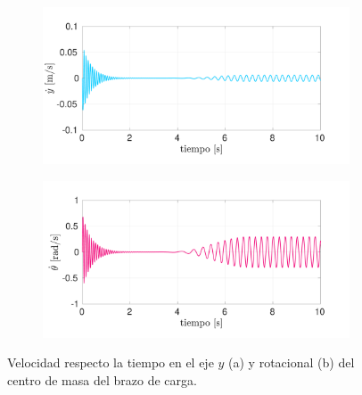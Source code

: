 \begin{figure}[p]
\centering
	\begin{subfigure}{1\linewidth}
		\centering
		\includegraphics[width=1\linewidth]{Imagenes/yp_2.pdf}
		\caption{}\label{fig:yp_2}
	\end{subfigure}
	\begin{subfigure}{1\linewidth}
		\centering
		\includegraphics[width=1\linewidth]{Imagenes/tp_2.pdf}
		\caption{}\label{fig:tp_2}
	\end{subfigure}
\par\bigskip
\caption{Velocidad respecto la tiempo en el eje $y$ (a) y rotacional (b) del centro de masa del brazo de carga.}
\label{fig:ytp_2}
\end{figure}

